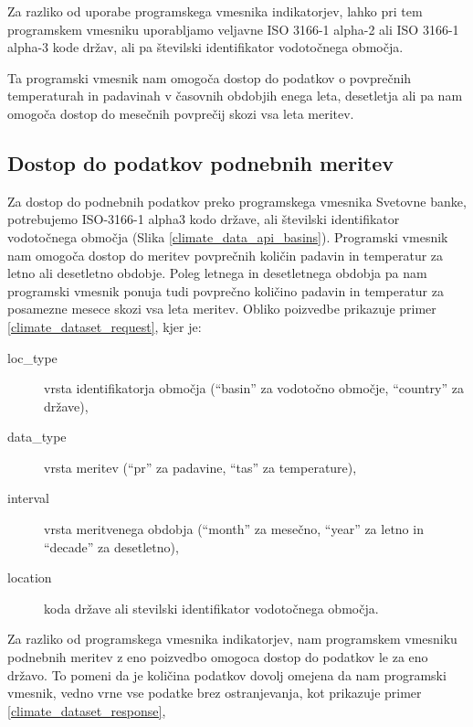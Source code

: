 Za razliko od uporabe programskega vmesnika indikatorjev, lahko pri tem
programskem vmesniku uporabljamo veljavne ISO 3166-1 alpha-2 ali ISO 3166-1 
alpha-3 kode držav, ali pa številski identifikator vodotočnega 
območja.

Ta programski vmesnik nam omogoča dostop do podatkov o povprečnih 
temperaturah in padavinah v časovnih obdobjih enega leta, desetletja ali pa 
nam omogoča dostop do mesečnih povprečij skozi vsa leta meritev.


\subsection{Dostop do podatkov podnebnih meritev}

Za dostop do podnebnih podatkov preko programskega vmesnika Svetovne banke,
potrebujemo ISO-3166-1 alpha3 kodo države, ali številski identifikator
vodotočnega območja (Slika \ref{climate_data_api_basins}). Programski vmesnik
nam omogoča dostop do meritev povprečnih količin padavin in temperatur za 
letno ali desetletno obdobje. Poleg letnega in desetletnega obdobja pa nam 
programski vmesnik ponuja tudi povprečno količino padavin in temperatur za 
posamezne mesece skozi vsa leta meritev. Obliko poizvedbe prikazuje primer 
\ref{climate_dataset_request}, kjer je:
\begin{description}
\item [loc\_type] vrsta identifikatorja območja (``basin'' za vodotočno območje, 
  ``country'' za države),
\item [data\_type] vrsta meritev (``pr'' za padavine, ``tas'' za temperature),
\item [interval] vrsta meritvenega obdobja (``month'' za mesečno, ``year'' za letno in
  ``decade'' za desetletno),
\item [location] koda države ali stevilski identifikator vodotočnega območja.
\end{description}
Za razliko od programskega vmesnika indikatorjev, nam programskem vmesniku
podnebnih meritev z eno poizvedbo omogoca dostop do podatkov le za eno državo.
To pomeni da je količina podatkov dovolj omejena da nam programski vmesnik,
vedno vrne vse podatke brez ostranjevanja, kot prikazuje primer 
\ref{climate_dataset_response},


